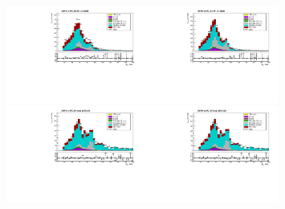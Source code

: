 \begin{figure}[htb]
  \begin{center}
    \includegraphics[width=0.40\textwidth]{../figs/figs_v11/ELECTRON_WGamma/PrepareYields/c_TotalDATAvsMC_Barrel__Mpholep1PRELIMINARY_FOR_E_TO_GAMMA_WITH_PSV_CUT_pt15to20_.pdf}\includegraphics[width=0.40\textwidth]{../figs/figs_v11/ELECTRON_WGamma/PrepareYields/c_TotalDATAvsMC_Barrel__Mpholep1PRELIMINARY_FOR_E_TO_GAMMA_WITH_PSV_CUT_pt15to20__etogScale.pdf}\\
    \includegraphics[width=0.40\textwidth]{../figs/figs_v11/ELECTRON_WGamma/PrepareYields/c_TotalDATAvsMC_Endcap__Mpholep1PRELIMINARY_FOR_E_TO_GAMMA_WITH_PSV_CUT_pt15to20_.pdf}\includegraphics[width=0.40\textwidth]{../figs/figs_v11/ELECTRON_WGamma/PrepareYields/c_TotalDATAvsMC_Endcap__Mpholep1PRELIMINARY_FOR_E_TO_GAMMA_WITH_PSV_CUT_pt15to20__etogScale.pdf}\\

\end{center}
\end{figure}
